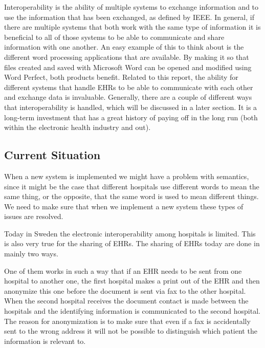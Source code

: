 \documentclass[14pt]{article}
\begin{document}

Interoperability is the ability of multiple systems to exchange information and to use the information that has been exchanged, as defined by \gls{IEEE}.  In general, if there are multiple systems that both work with the same type of information it is beneficial to all of those systems to be able to communicate and share information with one another.  An easy example of this to think about is the different word processing applications that are available.  By making it so that files created and saved with Microsoft Word can be opened and modified using Word Perfect, both products benefit.  Related to this report, the ability for different systems that handle \glspl{EHR} to be able to communicate with each other and exchange data is invaluable.  Generally, there are a couple of different ways that interoperability is handled, which will be discussed in a later section.  It is a long-term investment that has a great history of paying off in the long run (both within the electronic health industry and out).

\label{sec:interopDefinition}

\subsection{Current Situation} %
When a new system is implemented we might have a problem with semantics, since it might be the case that different hospitals use different words to mean the same thing, or the opposite, that the same word is used to mean different things. We need to make sure that when we implement a new system these types of issues are resolved.~\cite{Empirica}

Today in Sweden the electronic \gls{interoperability} among hospitals is limited. This is also very true for the sharing of \glspl{EHR}. The sharing of \glspl{EHR} today are done in mainly two ways.

One of them works in such a way that if an \gls{EHR} needs to be sent from one hospital to another one, the first hospital makes a print out of the \gls{EHR} and then anonymize this one before the document is sent via fax to the other hospital. When the second hospital receives the document contact is made between the hospitals and the identifying information is communicated to the second hospital.\cite{EPJ2} The reason for anonymization is to make sure that even if a fax is accidentally sent to the wrong address it will not be possible to distinguish which patient the information is relevant to.
\end{document}
